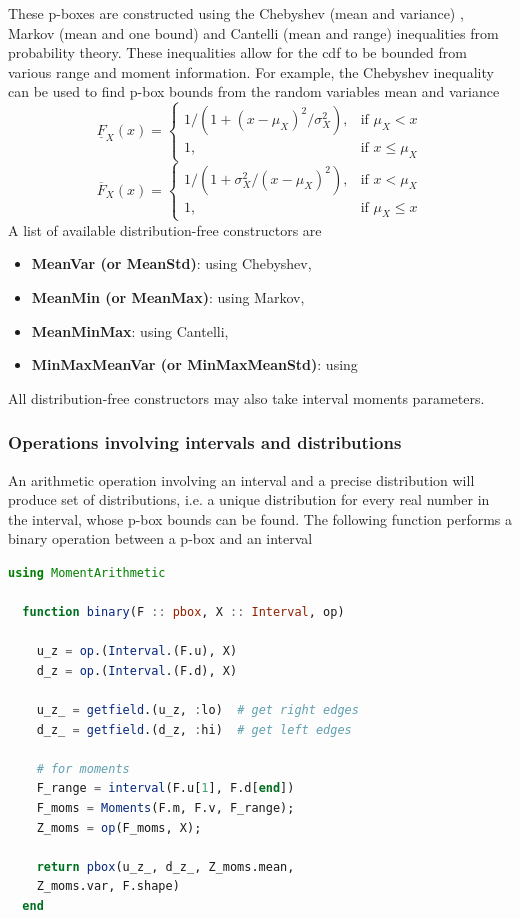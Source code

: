 \documentclass{juliacon}
\begin{document}
These p-boxes are constructed using the Chebyshev (mean and variance) \cite{chebyshev1874valeurs}, Markov (mean and one bound) \cite{markoff1900question} and Cantelli (mean and range) inequalities from probability theory. These inequalities allow for the cdf to be bounded from various range and moment information. For example, the Chebyshev inequality can be used to find p-box bounds from the random variables mean and variance
\begin{equation*}
  \underline{F}_{X}(x) = \begin{cases} 1 / (1 + (x - \mu_{X})^2 / \sigma^{2}_{X}),& \text{if } \mu_{X}<x \\
    1,& \text{if } x\leq \mu_{X} \end{cases}
\end{equation*}
\begin{equation*}
  \overline{F}_{X}(x)  = \begin{cases} 1 / (1 + \sigma^{2}_{X}/(x - \mu_{X})^2),& \text{if } x<\mu_{X} \\
  1,& \text{if } \mu_{X}\leq x \end{cases}
\end{equation*}
\noindent A list of available distribution-free constructors are
\begin{itemize}
  \item \textbf{MeanVar (or MeanStd)}: using Chebyshev,
  \item \textbf{MeanMin (or MeanMax)}: using Markov,
  \item \textbf{MeanMinMax}: using Cantelli,
  \item \textbf{MinMaxMeanVar (or MinMaxMeanStd)}: using \cite{ferson2021distribution}
\end{itemize}
\noindent All distribution-free constructors may also take interval moments parameters.
\subsubsection{Operations involving intervals and distributions}
An arithmetic operation involving an interval and a precise distribution will produce set of distributions, i.e. a unique distribution for every real number in the interval, whose p-box bounds can be found. The following function performs a binary operation between a p-box and an interval
\begin{lstlisting}[language = Julia]
  using MomentArithmetic

  function binary(F :: pbox, X :: Interval, op)

    u_z = op.(Interval.(F.u), X)
    d_z = op.(Interval.(F.d), X)

    u_z_ = getfield.(u_z, :lo)  # get right edges
    d_z_ = getfield.(d_z, :hi)  # get left edges

    # for moments
    F_range = interval(F.u[1], F.d[end])
    F_moms = Moments(F.m, F.v, F_range);
    Z_moms = op(F_moms, X);

    return pbox(u_z_, d_z_, Z_moms.mean, 
    Z_moms.var, F.shape)
  end
\end{lstlisting}
\end{document}
